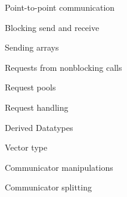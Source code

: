  {Point-to-point communication}

\begin{numberedframe}{Blocking send and receive}
  
\end{numberedframe}
\begin{numberedframe}{Sending arrays}
  
\end{numberedframe}

\begin{numberedframe}{Requests from nonblocking calls}
  
\end{numberedframe}
\begin{numberedframe}{Request pools}
  
\end{numberedframe}
\begin{numberedframe}{Request handling}
  
\end{numberedframe}

 {Derived Datatypes}

\begin{numberedframe}{Vector type}
  
\end{numberedframe}

 {Communicator manipulations}

\begin{numberedframe}{Communicator splitting}
  
\end{numberedframe}


